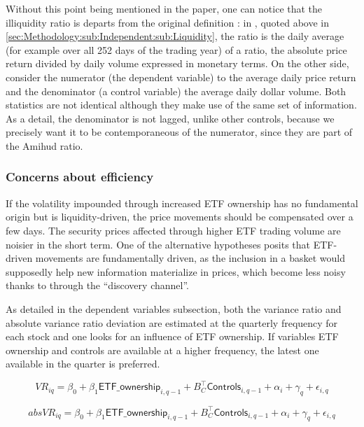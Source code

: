 Without this point being mentioned in the paper, one can notice that the illiquidity ratio is departs from the original definition : in \textcite{Amihud2002}, quoted above in \autoref{sec:Methodology:sub:Independent:sub:Liquidity}, the ratio is the daily average (for example over all 252 days of the trading year) of a ratio, the absolute price return divided by daily volume expressed in monetary terms. On the other side, \textcite{Israeli2017} consider the numerator (the dependent variable) to the average daily price return and the denominator (a control variable) the average daily dollar volume. Both statistics are not identical although they make use of the same set of information. As a detail, the denominator is not lagged, unlike other controls, because we precisely want it to be contemporaneous of the numerator, since they are part of the Amihud ratio.

\subsubsection{Concerns about efficiency}
\label{subsec:Method:Efficiency}
If the volatility impounded through increased ETF ownership has no fundamental origin but is liquidity-driven, the price movements should be compensated over a few days. The security prices affected through higher ETF trading volume are noisier in the short term. One of the alternative hypotheses posits that ETF-driven movements are fundamentally driven, as the inclusion in a basket would supposedly help new information materialize in prices, which become less noisy thanks to through the ``discovery channel''.

As detailed in the dependent variables subsection, both the variance ratio and absolute variance ratio deviation are estimated at the quarterly frequency for each stock and one looks for an influence of ETF ownership. If variables ETF ownership and controls are available at a higher frequency, the latest one available in the quarter is preferred.

\begin{equation}
  VR_{iq} = \beta_{0} + \beta_{1} \mathsf{ETF\_ownership}_{i, q - 1} + B_{C}^{\intercal} \mathsf{Controls}_{i, q - 1} + \alpha_{i} + \gamma_{q} + \epsilon_{i, q}
\end{equation}

\begin{equation}
 absVR_{iq} = \beta_{0} + \beta_{1} \mathsf{ETF\_ownership}_{i, q - 1} + B_{C}^{\intercal} \mathsf{Controls}_{i, q - 1} + \alpha_{i} + \gamma_{q} + \epsilon_{i, q}
\end{equation}
